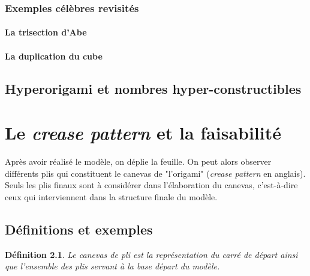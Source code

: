 \documentclass[a4paper,12pt,french,draft]{report}
\newtheorem{definition}{Définition}[section]
\begin{document}
	\subsection{Exemples célèbres revisités}
		\subsubsection{La trisection d'Abe}
		\subsubsection{La duplication du cube}

	\section{Hyperorigami et nombres hyper-constructibles}
	









	
\chapter{Le \emph{crease pattern} et la faisabilité}

Après avoir réalisé le modèle, on déplie la feuille. On peut alors 
observer différents plis qui constituent le canevas de 
"l'origami" (\emph{crease pattern} en anglais). Seuls les plis finaux 
sont à considérer dans l'élaboration du 
canevas, c'est-à-dire ceux qui interviennent dans la structure finale 
du modèle. 


	\section{Définitions et exemples}
 
    \begin{definition} 
      
      Le canevas de pli est la représentation du carré de départ ainsi que l'ensemble des plis 
      servant à la base départ du modèle.
      
    \end{definition}
    
\end{document}
